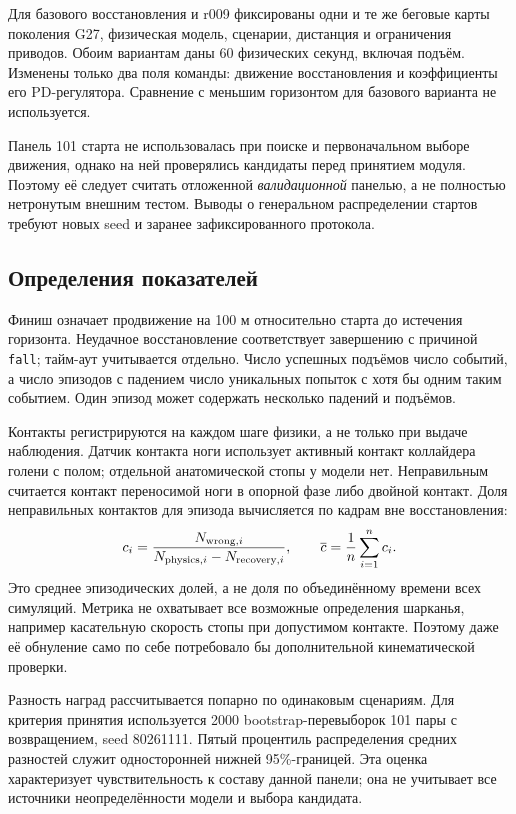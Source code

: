 \documentclass[11pt,a4paper]{article}
\newcommand{\code}[1]{\texttt{#1}}
\begin{document}
Для базового восстановления и r009 фиксированы одни и те же беговые карты поколения G27, физическая модель, сценарии, дистанция и ограничения приводов. Обоим вариантам даны 60 физических секунд, включая подъём. Изменены только два поля команды: движение восстановления и коэффициенты его PD-регулятора. Сравнение с меньшим горизонтом для базового варианта не используется.

Панель 101 старта не использовалась при поиске и первоначальном выборе движения, однако на ней проверялись кандидаты перед принятием модуля. Поэтому её следует считать отложенной \emph{валидационной} панелью, а не полностью нетронутым внешним тестом. Выводы о генеральном распределении стартов требуют новых seed и заранее зафиксированного протокола.

\subsection{Определения показателей}
Финиш означает продвижение на 100 м относительно старта до истечения горизонта. Неудачное восстановление соответствует завершению с причиной \code{fall}; тайм-аут учитывается отдельно. Число успешных подъёмов \textemdash{} число событий, а число эпизодов с падением \textemdash{} число уникальных попыток с хотя бы одним таким событием. Один эпизод может содержать несколько падений и подъёмов.

Контакты регистрируются на каждом шаге физики, а не только при выдаче наблюдения. Датчик контакта ноги использует активный контакт коллайдера голени с полом; отдельной анатомической стопы у модели нет. Неправильным считается контакт переносимой ноги в опорной фазе либо двойной контакт. Доля неправильных контактов для эпизода вычисляется по кадрам вне восстановления:
\begin{equation}
 c_i=\frac{N_{{\rm wrong},i}}{N_{{\rm physics},i}-N_{{\rm recovery},i}},
 \qquad \overline c=\frac{1}{n}\sum_{i=1}^{n}c_i.
 \label{eq:contact}
\end{equation}
Это среднее эпизодических долей, а не доля по объединённому времени всех симуляций. Метрика не охватывает все возможные определения шарканья, например касательную скорость стопы при допустимом контакте. Поэтому даже её обнуление само по себе потребовало бы дополнительной кинематической проверки.

Разность наград рассчитывается попарно по одинаковым сценариям. Для критерия принятия используется 2000 bootstrap-перевыборок 101 пары с возвращением, seed 80261111. Пятый процентиль распределения средних разностей служит односторонней нижней 95\%-границей. Эта оценка характеризует чувствительность к составу данной панели; она не учитывает все источники неопределённости модели и выбора кандидата.
\end{document}
